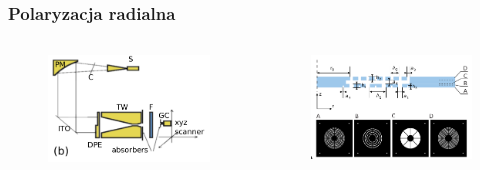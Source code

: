 \documentclass{beamer}
\begin{document}
\begin{frame}
\begin{columns}
\begin{column}{0.5\textwidth}
\begin{figure}
			\end{figure}
		\end{column}
	\end{columns}
		
\end{frame}

\begin{frame}
	\frametitle{Polaryzacja radialna}
	\begin{columns}
		\begin{column}{0.5\textwidth}
			\begin{figure}
				\includegraphics[width=\textwidth]{../images/dmg/express_exp_setu.png}\\
			\end{figure}
		\end{column}
		\begin{column}{0.5\textwidth}
			\begin{figure}
				\includegraphics[width=\textwidth]{../images/dmg/express_siatki.png}\\
			\end{figure}
		\end{column}
	\end{columns}
		
\end{frame}
\end{document}
